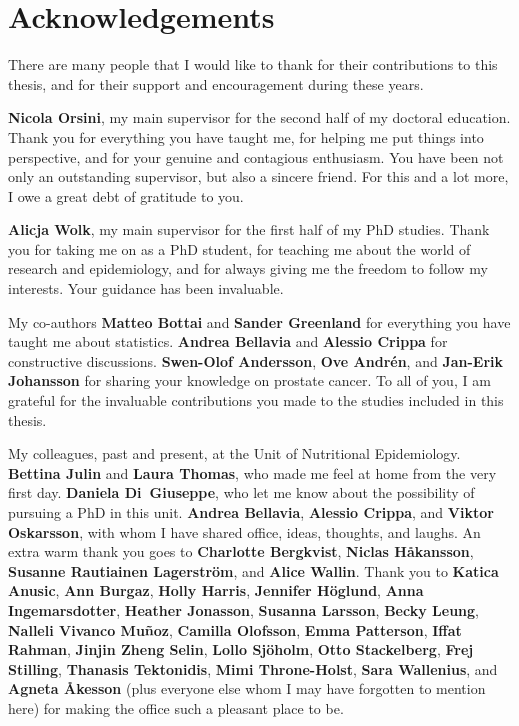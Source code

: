 %

\chapter{Acknowledgements}

There are many people that I would like to thank for their contributions to this thesis, and for their support and encouragement during these  years.

\bigskip

\textbf{Nicola Orsini}, my main supervisor for the second half of my doctoral education. Thank you for everything you have taught me, for helping me put things into perspective, and for your genuine and contagious enthusiasm. You have been not only an outstanding supervisor, but also a sincere friend. For this and a lot more, I owe a great debt of gratitude to you.

\bigskip

\textbf{Alicja Wolk}, my main supervisor for the first half of my PhD studies. Thank you for taking me on as a PhD student, for teaching me about the world of research and epidemiology, and for always giving me the freedom to follow my interests. Your guidance has been invaluable.

\bigskip

My co-authors \textbf{Matteo Bottai} and \textbf{Sander Greenland} for everything you have taught me about statistics. \textbf{Andrea Bellavia} and  \textbf{Alessio Crippa} for constructive discussions. \textbf{Swen-Olof Andersson}, \textbf{Ove Andrén}, and \textbf{Jan-Erik Johansson} for sharing your knowledge on prostate cancer. To all of you, I am grateful for the invaluable contributions you made to the studies included in this thesis.

\bigskip

My colleagues, past and present, at the Unit of Nutritional Epidemiology.  \textbf{Bettina Julin} and \textbf{Laura Thomas}, who made me feel at home from the very first day. \textbf{Daniela Di~Giuseppe}, who let me know about the possibility of pursuing a PhD in this unit. \textbf{Andrea Bellavia}, \textbf{Alessio Crippa}, and \textbf{Viktor Oskarsson}, with whom I have shared office, ideas, thoughts, and laughs.  An extra warm thank you goes to \textbf{Charlotte Bergkvist},  \textbf{Niclas Håkansson}, \textbf{Susanne Rautiainen Lagerström}, and \textbf{Alice Wallin}. Thank you to \textbf{Katica Anusic}, \textbf{Ann Burgaz}, \textbf{Holly Harris}, \textbf{Jennifer Höglund}, \textbf{Anna Ingemarsdotter}, \textbf{Heather Jonasson}, \textbf{Susanna Larsson}, \textbf{Becky Leung}, \textbf{Nalleli Vivanco Muñoz},  \textbf{Camilla Olofsson}, \textbf{Emma Patterson}, \textbf{Iffat Rahman}, \textbf{Jinjin Zheng Selin}, \textbf{Lollo Sjöholm}, \textbf{Otto Stackelberg}, \textbf{Frej Stilling}, \textbf{Thanasis Tektonidis}, \textbf{Mimi Throne-Holst}, \textbf{Sara Wallenius}, and \textbf{Agneta Åkesson} (plus everyone else whom I may have forgotten to mention here) for making the office such a pleasant place to be.

